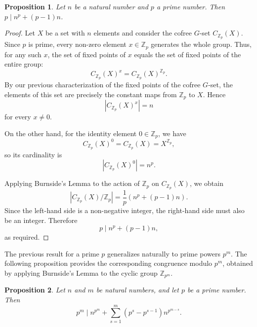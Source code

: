 \documentclass{amsart}
\newtheorem{proposition}{Proposition}
\begin{document}
\begin{proposition}\label{prop:fermat_prime}
Let $n$ be a natural number and $p$ a prime number. Then $p \mid n^p + (p-1)n$.
\end{proposition}

\begin{proof}
Let $X$ be a set with $n$ elements and consider the cofree $G$-set $C_{\mathbb{Z}_p}(X)$. 
Since $p$ is prime, every non-zero element $x \in \mathbb{Z}_p$ generates the whole group. 
Thus, for any such $x$, the set of fixed points of $x$ equals the set of fixed points of the entire group:
\[
C_{\mathbb{Z}_p}(X)^x = C_{\mathbb{Z}_p}(X)^{\mathbb{Z}_p}.
\]
By our previous characterization of the fixed points of the cofree $G$-set, the elements of this set are precisely the constant maps from $\mathbb{Z}_p$ to $X$. Hence 
\[
\left\lvert C_{\mathbb{Z}_p}(X)^x \right\rvert = n
\]
for every $x \neq 0$.

On the other hand, for the identity element $0 \in \mathbb{Z}_p$, we have
\[
C_{\mathbb{Z}_p}(X)^0 = C_{\mathbb{Z}_p}(X) = X^{\mathbb{Z}_p},
\]
so its cardinality is
\[
\left\lvert C_{\mathbb{Z}_p}(X)^0 \right\rvert = n^p.
\]

Applying Burnside's Lemma to the action of $\mathbb{Z}_p$ on $C_{\mathbb{Z}_p}(X)$, we obtain
\[
\left\lvert C_{\mathbb{Z}_p}(X)/\mathbb{Z}_p \right\rvert
= \frac{1}{p} \left( n^p + (p-1)n \right).
\]
Since the left-hand side is a non-negative integer, the right-hand side must also be an integer. Therefore
\[
p \mid n^p + (p-1)n,
\]
as required.
\end{proof}

The previous result for a prime $p$ generalizes naturally to prime powers $p^m$. The following proposition provides the corresponding congruence modulo $p^m$, obtained by applying Burnside's Lemma to the cyclic group $\mathbb{Z}_{p^m}$.

\begin{proposition}\label{prop:fermat_prime_power}
Let $n$ and $m$ be natural numbers, and let $p$ be a prime number. Then
\[
p^m \mid n^{p^m} + \sum_{s=1}^m (p^s - p^{s-1}) n^{p^{m-s}}.
\]
\end{proposition}
\end{document}
